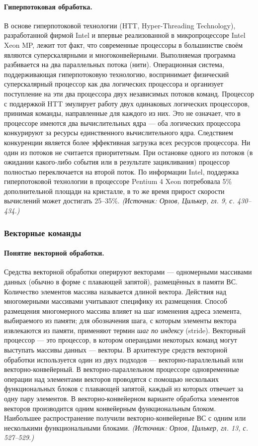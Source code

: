 \documentclass[a4paper,12pt]{article}
\begin{document}
\paragraph{Гиперпотоковая обработка.}
В основе гиперпотоковой технологии (HTT, Hyper-Threading Technology), разработанной фирмой Intel и впервые реализованной в микропроцессоре Intel Xeon MP, лежит тот факт, что современные процессоры в большинстве своём являются суперскалярными и многоконвейерными. Выполняемая программа разбивается на два параллельных потока (нити). Операционная система, поддерживающая гиперпотоковую технологию, воспринимает физический суперскалярный процессор как два логических процессора и организует поступление на эти два процессора двух независимых потоков команд. Процессор с поддержкой HTT эмулирует работу двух одинаковых логических процессоров, принимая команды, направленные для каждого из них. Это не означает, что в процессоре имеются два вычислительных ядра --- оба логических процессора конкурируют за ресурсы единственного вычислительного ядра. Следствием конкуренции является более эффективная загрузка всех ресурсов процессора. Ни один из потоков не считается приоритетным. При остановке одного из потоков (в ожидании какого-либо события или в результате зацикливания) процессор полностью переключается на второй поток. По информации Intel, поддержка гиперпотоковой технологии в процессоре Pentium 4 Xeon потребовала 5\% дополнительной площади на кристалле, в то же время прирост скорости вычислений может достигать 25--35\%.
\textit{(Источник: Орлов, Цилькер, гл. 9, с. 430--434.)}

\subsubsection{Векторные команды}

\paragraph{Понятие векторной обработки.}
Средства векторной обработки оперируют векторами --- одномерными массивами данных (обычно в форме с плавающей запятой), размещённых в памяти ВС. Количество элементов массива называется длиной вектора. Действия над многомерными массивами учитывают специфику их размещения. Способ размещения многомерного массива влияет на шаг изменения адреса элемента, выбираемого из памяти; для обозначения шага, с которым элементы вектора извлекаются из памяти, применяют термин \emph{шаг по индексу} (stride). Векторный процессор --- это процессор, в котором операндами некоторых команд могут выступать массивы данных --- векторы. В архитектуре средств векторной обработки используется один из двух подходов --- векторно-параллельный или векторно-конвейерный. В векторно-параллельном процессоре одновременные операции над элементами векторов проводятся с помощью нескольких функциональных блоков с плавающей запятой, каждый из которых отвечает за одну пару элементов. В векторно-конвейерном варианте обработка элементов векторов производится одним конвейерным функциональным блоком. Наибольшее распространение получили векторно-конвейерные ВС с одним или несколькими функциональными блоками.
\textit{(Источник: Орлов, Цилькер, гл. 13, с. 527--529.)}
\end{document}
